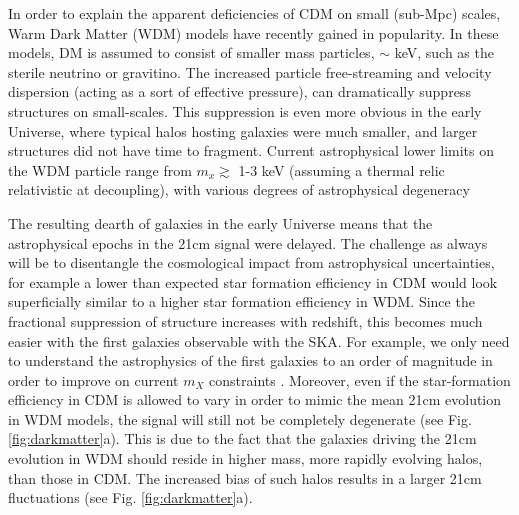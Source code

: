 \documentclass{PoS}
\begin{document}
In order to explain the apparent deficiencies of CDM on small (sub-Mpc) scales, Warm Dark Matter (WDM) models have recently gained in popularity.  In these models, DM is assumed to consist of smaller mass particles, $\sim$ keV, such as the sterile neutrino or gravitino.  The increased particle free-streaming and velocity dispersion (acting as a sort of effective pressure), can dramatically suppress structures on small-scales.  This suppression is even more obvious in the early Universe, where typical halos hosting galaxies were much smaller, and larger structures did not have time to fragment.  Current astrophysical lower limits on the WDM particle range from $m_x \gtrsim$ 1-3 keV (assuming a thermal relic relativistic at decoupling), with various degrees of astrophysical degeneracy \cite[e.g.][]{2013MNRAS.432.3218D,2013ApJ...767...22K,2014MNRAS.443..678P,2013PhRvD..88d3502V}

The resulting dearth of galaxies in the early Universe means that the astrophysical epochs in the 21cm signal were delayed.  The challenge as always will be to disentangle the cosmological impact from astrophysical uncertainties, for example a lower than expected star formation efficiency in CDM would look superficially similar to a higher star formation efficiency in WDM.  Since the fractional suppression of structure increases with redshift, this becomes much easier with the first galaxies observable with the SKA.  For example, we only need to understand the astrophysics of the first galaxies to an order of magnitude in order to improve on current $m_X$ constraints \citep{2014MNRAS.438.2664S}.
Moreover, even if the star-formation efficiency in CDM is allowed to vary in order to mimic the mean 21cm evolution in WDM models, the signal will still not be completely degenerate (see Fig. \ref{fig:darkmatter}a).  This is due to the fact that the galaxies driving the 21cm evolution in WDM should reside in higher mass, more rapidly evolving halos, than those in CDM.  The increased bias of such halos results in a larger 21cm fluctuations (see Fig. \ref{fig:darkmatter}a).
\end{document}
